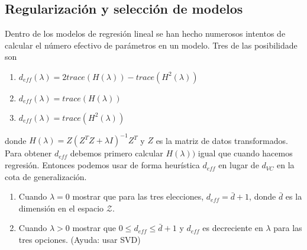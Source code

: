 \documentclass[11pt,leqno]{article}
\theoremstyle{definition}
\begin{document}
\begin{solucion}
\end{solucion}

\subsection{Regularización y selección de modelos}
\begin{cuestion}
Dentro de los modelos de regresión lineal se han hecho numerosos intentos de calcular el número efectivo de parámetros en un modelo. Tres de las posibilidade son
         \begin{enumerate}[a]
         \item $d_{eff}(\lambda) = 2trace(H(\lambda))- trace(H^2(\lambda))$
         \item $d_{eff}(\lambda) = trace(H(\lambda))$
         \item $d_{eff}(\lambda) = trace(H^2(\lambda))$
         \end{enumerate}
         donde $H(\lambda) = Z(Z^T Z+ \lambda I)^{-1} Z^T$ y $Z$ es la matriz de datos transformados. Para obtener $d_{eff}$ debemos primero calcular $H(\lambda))$ igual que cuando hacemos regresión. Entonces podemos usar de forma heurística $d_{eff}$ en lugar de $d_{VC}$ en la cota de generalización.
         \begin{enumerate}
             \item  Cuando $\lambda = 0$ mostrar que para las tres elecciones, $d_{eff}=\bar{d}+1$, donde $\bar{d}$ es la dimensión en el  espacio $\mathcal{Z}$.
             \item Cuando $\lambda > 0$ mostrar que $0 \leq d_{eff} \leq\bar{d}+1$ y $d_{eff}$ es decreciente en $\lambda$ para las tres opciones. (Ayuda: usar SVD)
         \end{enumerate}
\end{cuestion}

\begin{solucion}
\end{solucion}
\end{document}
